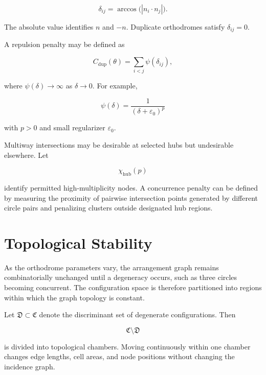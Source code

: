 \documentclass[11pt,fleqn]{book}
\numberwithin{equation}{chapter}
\theoremstyle{plain}
\theoremstyle{definition}
\theoremstyle{remark}
\begin{document}
\begin{equation}
    \delta_{ij}
    =
    \arccos\bigl(|n_i\cdot n_j|\bigr).
\end{equation}

The absolute value identifies \(n\) and \(-n\). Duplicate orthodromes satisfy \(\delta_{ij}=0\).

A repulsion penalty may be defined as

\begin{equation}
    C_{\mathrm{dup}}(\theta)
    =
    \sum_{i<j}
    \psi(\delta_{ij}),
\end{equation}

where \(\psi(\delta)\to\infty\) as \(\delta\to 0\). For example,

\begin{equation}
    \psi(\delta)
    =
    \frac{1}{(\delta+\varepsilon_0)^p}
\end{equation}

with \(p>0\) and small regularizer \(\varepsilon_0\).

Multiway intersections may be desirable at selected hubs but undesirable elsewhere. Let

\begin{equation}
    \chi_{\mathrm{hub}}(p)
\end{equation}

identify permitted high-multiplicity nodes. A concurrence penalty can be defined by measuring the proximity of pairwise intersection points generated by different circle pairs and penalizing clusters outside designated hub regions.

\section{Topological Stability}

As the orthodrome parameters vary, the arrangement graph remains combinatorially unchanged until a degeneracy occurs, such as three circles becoming concurrent. The configuration space is therefore partitioned into regions within which the graph topology is constant.

Let \(\mathfrak{D}\subset\mathfrak{C}\) denote the discriminant set of degenerate configurations. Then

\begin{equation}
    \mathfrak{C}\setminus\mathfrak{D}
\end{equation}

is divided into topological chambers. Moving continuously within one chamber changes edge lengths, cell areas, and node positions without changing the incidence graph.
\end{document}
